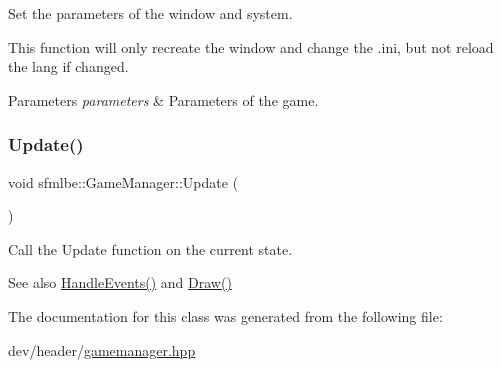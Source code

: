 Set the parameters of the window and system. 

This function will only recreate the window and change the .ini, but not reload the lang if changed. 
\begin{DoxyParams}{Parameters}
{\em parameters} & Parameters of the game. \\
\hline
\end{DoxyParams}
\mbox{\label{classsfmlbe_1_1_game_manager_a895a0457b48b9ccd36194a345b04b547}} 
\subsubsection{\texorpdfstring{Update()}{Update()}}
{\footnotesize\ttfamily void sfmlbe\+::\+Game\+Manager\+::\+Update (\begin{DoxyParamCaption}{ }\end{DoxyParamCaption})}



Call the Update function on the current state. 

\begin{DoxySeeAlso}{See also}
\mbox{\hyperlink{classsfmlbe_1_1_game_manager_a0fd18d663571814d08d14e6c1ed3191a}{Handle\+Events()}} and \mbox{\hyperlink{classsfmlbe_1_1_game_manager_a6c8377c22718038d018ebe7e26d3bdc3}{Draw()}} 
\end{DoxySeeAlso}


The documentation for this class was generated from the following file\+:\begin{DoxyCompactItemize}
\item 
dev/header/\mbox{\hyperlink{gamemanager_8hpp}{gamemanager.\+hpp}}\end{DoxyCompactItemize}
